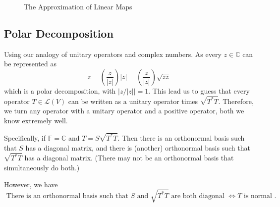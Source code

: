 \documentclass[../main.tex]{subfiles}
\begin{document}
\begin{figure}[H]
    \centering
    \caption{The Approximation of Linear Maps}
    \label{fig:the-approximation-of-linear-maps}
\end{figure}


\subsection{Polar Decomposition}

Using our analogy of unitary operators and complex numbers. As every $z\in \mathbb{C}$ can be represented as
\begin{equation*}
z = \left(\frac{z}{\left|z\right|}\right) \left|z\right| = \left(\frac{z}{\left|z\right|}\right) \sqrt{\overline{z}z}
\end{equation*}
which is a polar decomposition, with $\left|z / \left|z\right|\right|=1$. This lead us to guess that every operator $T\in \mathscr{L}(V)$ can be written as a unitary operator times $\sqrt{T^*T}$. Therefore, we turn any operator with a unitary operator and a positive operator, both we know extremely well.

Specifically, if $\mathbb{F}=\mathbb{C}$ and $T = S \sqrt{T^*T}$. Then there is an orthonormal basis such that $S$ has a diagonal matrix, and there is (another) orthonormal basis such that $\sqrt{T^*T}$ has a diagonal matrix. (There may not be an orthonormal basis that simultaneously do both.)

However, we have
\begin{equation*}
	\text{ There is an orthonormal basis such that $S$ and $\sqrt{T^*T}$ are both diagonal } \Leftrightarrow T \text{ is normal }.
\end{equation*}
\end{document}
